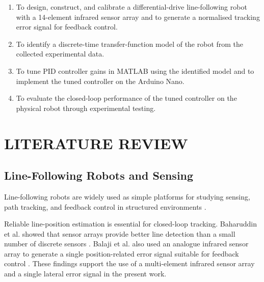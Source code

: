 \documentclass[a4paper,12pt,oneside]{book}
\begin{document}
\begin{enumerate}[label=\roman*., leftmargin=*]

    \item To design, construct, and calibrate a differential-drive line-following
    robot with a 14-element infrared sensor array and to generate a normalised
    tracking error signal for feedback control.

    \item To identify a discrete-time transfer-function model of the robot from
    the collected experimental data.

    \item To tune PID controller gains in MATLAB using the identified model and
    to implement the tuned controller on the Arduino Nano.

    \item To evaluate the closed-loop performance of the tuned controller on the
    physical robot through experimental testing.

\end{enumerate}



\newpage
\chapter{LITERATURE REVIEW}
\label{chap:lit_review}

\section{Line-Following Robots and Sensing}

Line-following robots are widely used as simple platforms for studying sensing,
path tracking, and feedback control in structured environments
\cite{brigido2025,balaji2015}.

Reliable line-position estimation is essential for closed-loop tracking.
Baharuddin et al. showed that sensor arrays provide better line detection than a
small number of discrete sensors \cite{baharuddin2006}. Balaji et al. also used
an analogue infrared sensor array to generate a single position-related error
signal suitable for feedback control \cite{balaji2015}. These findings support
the use of a multi-element infrared sensor array and a single lateral error
signal in the present work.
\end{document}
